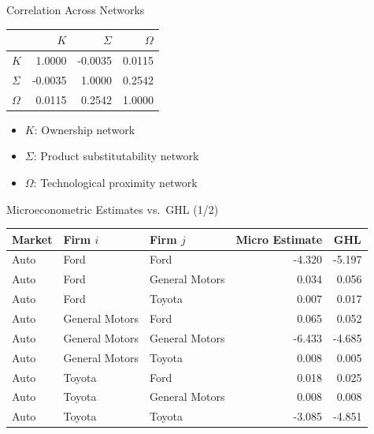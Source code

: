 \documentclass[
  10pt,
  aspectratio=169,   %
]{beamer}
\theoremstyle{plain}
\begin{document}
\begin{frame}{Correlation Across Networks}
  \label{network_correlations}
  \begin{center}
    \begin{tabular}{lrrr}
      \toprule
             & $K$      & $\Sigma$       & $\Omega$      \\
      \midrule
      $K$  & 1.0000     & -0.0035     & 0.0115     \\
      $\Sigma$  & -0.0035    & 1.0000      & 0.2542     \\
      $\Omega$  & 0.0115     & 0.2542      & 1.0000     \\
      \bottomrule
    \end{tabular}
  \end{center}
  \begin{itemize}
    \item $K$: Ownership network
    \item $\Sigma$: Product substitutability network
    \item $\Omega$: Technological proximity network
  \end{itemize}
\end{frame}

\begin{frame}[t]{Microeconometric Estimates vs.\ GHL \citep{Pellegrino2024-dn} (1/2)}
  \label{micro_vs_ghl}
  \begin{center}
    \begin{tabular}{lllrr}
      \toprule
      Market & Firm $i$       & Firm $j$       & \multicolumn{1}{c}{Micro Estimate} & \multicolumn{1}{c}{GHL} \\
      \midrule
      Auto   & Ford           & Ford           & -4.320                             & -5.197                  \\
      Auto   & Ford           & General Motors & 0.034                              & 0.056                   \\
      Auto   & Ford           & Toyota         & 0.007                              & 0.017                   \\
      Auto   & General Motors & Ford           & 0.065                              & 0.052                   \\
      Auto   & General Motors & General Motors & -6.433                             & -4.685                  \\
      Auto   & General Motors & Toyota         & 0.008                              & 0.005                   \\
      Auto   & Toyota         & Ford           & 0.018                              & 0.025                   \\
      Auto   & Toyota         & General Motors & 0.008                              & 0.008                   \\
      Auto   & Toyota         & Toyota         & -3.085                             & -4.851                  \\
      \bottomrule
    \end{tabular}
  \end{center}
  \hyperlink{product_identification}{}
\end{frame}
\end{document}
